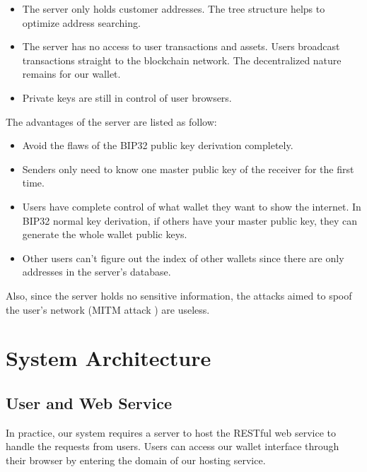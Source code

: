 \begin{adjustwidth}{1cm}{}
    \begin{itemize}
        \item The server only holds customer addresses. The tree structure helps to optimize address searching.
        \item The server has no access to user transactions and assets. Users broadcast transactions straight to the blockchain network. The decentralized nature remains for our wallet.
        \item Private keys are still in control of user browsers.
    \end{itemize}

    The advantages of the server are listed as follow:

    \begin{itemize}
        \item Avoid the flaws of the BIP32 public key derivation completely.
        \item Senders only need to know one master public key of the receiver for the first time.
        \item Users have complete control of what wallet they want to show the internet. In BIP32 normal key derivation, if others have your master public key, they can generate the whole wallet public keys.
        \item Other users can't figure out the index of other wallets since there are only addresses in the server's database.
    \end{itemize}

    Also, since the server holds no sensitive information, the attacks aimed to spoof the user’s network (MITM attack \cite{mitm}) are useless.

\end{adjustwidth}



\section{System Architecture}
\label{system_architect}

\subsection{User and Web Service}

In practice, our system requires a server to host the RESTful web service to handle the requests from users. Users can access our wallet interface through their browser by entering the domain of our hosting service.


